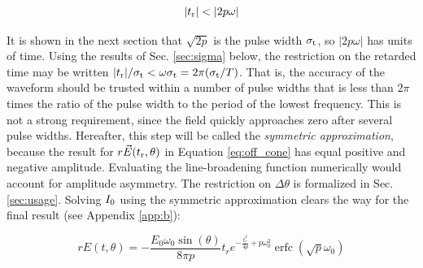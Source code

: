 \documentclass[amsmath,amssymb,aps,prd,10pt,twocolumn]{revtex4}
\DeclareMathOperator\erfc{erfc}
\begin{document}
\begin{equation}
|t_{\rm r}| < | 2 p \omega | \label{eq:restrict}
\end{equation}

It is shown in the next section that $\sqrt{2p}$ is the pulse width $\sigma_{\rm t}$, so $| 2 p \omega |$ has units of time.  Using the results of Sec. \ref{sec:sigma} below, the restriction on the retarded time may be written $|t_{\rm r}|/\sigma_{\rm t} < \omega \sigma_{\rm t} = 2\pi (\sigma_{\rm t}/T)$.  That is, the accuracy of the waveform should be trusted within a number of pulse widths that is less than $2\pi$ times the ratio of the pulse width to the period of the lowest frequency.  This is not a strong requirement, since the field quickly approaches zero after several pulse widths.  Hereafter, this step will be called the \textit{symmetric approximation}, because the result for $r \vec{E}(t_{\rm r},\theta)$ in Equation \ref{eq:off_cone} has equal positive and negative amplitude.  Evaluating the line-broadening function numerically would account for amplitude asymmetry.  The restriction on $\Delta\theta$ is formalized in Sec. \ref{sec:usage}.  Solving $I_{\rm 0}$ using the symmetric approximation clears the way for the final result (see Appendix \ref{app:b}):

\begin{equation}
\boxed{
r E(t,\theta) = -\frac{E_0 \omega_0 \sin(\theta)}{8 \pi p} t_r e^{-\frac{t_r^2}{4p} + p \omega_0^2}\erfc(\sqrt{p}\omega_0)
} \label{eq:off_cone}
\end{equation}
\end{document}
